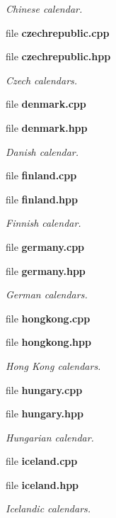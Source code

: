 \begin{DoxyCompactItemize}
\begin{DoxyCompactList}\small\item\em Chinese calendar. \end{DoxyCompactList}\item 
file {\bf czechrepublic.\+cpp}
\item 
file {\bf czechrepublic.\+hpp}
\begin{DoxyCompactList}\small\item\em Czech calendars. \end{DoxyCompactList}\item 
file {\bf denmark.\+cpp}
\item 
file {\bf denmark.\+hpp}
\begin{DoxyCompactList}\small\item\em Danish calendar. \end{DoxyCompactList}\item 
file {\bf finland.\+cpp}
\item 
file {\bf finland.\+hpp}
\begin{DoxyCompactList}\small\item\em Finnish calendar. \end{DoxyCompactList}\item 
file {\bf germany.\+cpp}
\item 
file {\bf germany.\+hpp}
\begin{DoxyCompactList}\small\item\em German calendars. \end{DoxyCompactList}\item 
file {\bf hongkong.\+cpp}
\item 
file {\bf hongkong.\+hpp}
\begin{DoxyCompactList}\small\item\em Hong Kong calendars. \end{DoxyCompactList}\item 
file {\bf hungary.\+cpp}
\item 
file {\bf hungary.\+hpp}
\begin{DoxyCompactList}\small\item\em Hungarian calendar. \end{DoxyCompactList}\item 
file {\bf iceland.\+cpp}
\item 
file {\bf iceland.\+hpp}
\begin{DoxyCompactList}\small\item\em Icelandic calendars. \end{DoxyCompactList}\item 

\end{DoxyCompactItemize}
